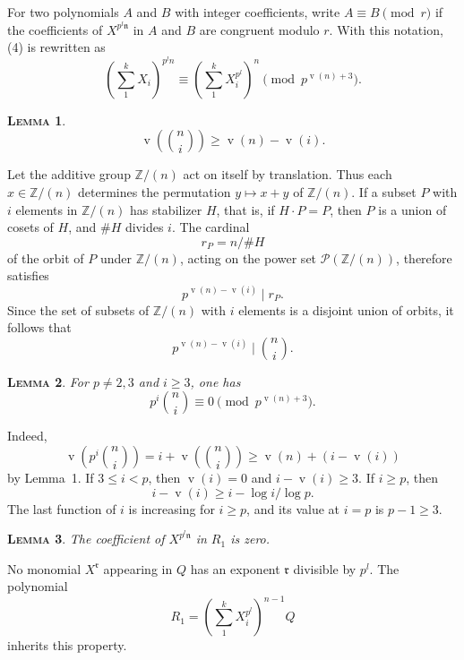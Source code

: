\documentclass[12pt]{amsart}
\theoremstyle{plain}
\newtheorem{lem}{\textsc{Lemma}}
\DeclareMathOperator{\vord}{v}
\begin{document}
For two polynomials $A$ and $B$ with integer coefficients, write $A\equiv B\pmod r$ if the coefficients of $X^{p^l\mathfrak n}$ in $A$ and $B$ are congruent modulo $r$. With this notation, (4) is rewritten as
\begin{equation}
\left(\sum_1^k X_i\right)^{p^l n}\equiv \left(\sum_1^k X_i^{p^l}\right)^n\pmod {p^{\vord(n)+3}}.\tag{8}
\end{equation}

\begin{lem}
\begin{equation}
\vord\!\left(\binom{n}{i}\right)\geq \vord(n)-\vord(i).\tag{9}
\end{equation}
\end{lem}

Let the additive group $\mathbb Z/(n)$ act on itself by translation. Thus each $x\in\mathbb Z/(n)$ determines the permutation $y\mapsto x+y$ of $\mathbb Z/(n)$. If a subset $P$ with $i$ elements in $\mathbb Z/(n)$ has stabilizer $H$, that is, if $H\cdot P=P$, then $P$ is a union of cosets of $H$, and $\#H$ divides $i$. The cardinal
\[
r_P=n/\#H
\]
of the orbit of $P$ under $\mathbb Z/(n)$, acting on the power set $\mathscr P(\mathbb Z/(n))$, therefore satisfies
\[
p^{\vord(n)-\vord(i)}\mid r_P.
\]
Since the set of subsets of $\mathbb Z/(n)$ with $i$ elements is a disjoint union of orbits, it follows that
\[
p^{\vord(n)-\vord(i)}\mid \binom{n}{i}.
\]

\begin{lem}
For $p\neq 2,3$ and $i\geq 3$, one has
\begin{equation}
p^i\binom{n}{i}\equiv 0\pmod {p^{\vord(n)+3}}.\tag{10}
\end{equation}
\end{lem}

Indeed,
\[
\vord\!\left(p^i\binom{n}{i}\right)=i+\vord\!\left(\binom{n}{i}\right)
\geq \vord(n)+(i-\vord(i))
\]
by Lemma~1. If $3\leq i<p$, then $\vord(i)=0$ and $i-\vord(i)\geq 3$. If $i\geq p$, then
\[
i-\vord(i)\geq i-\log i/\log p.
\]
The last function of $i$ is increasing for $i\geq p$, and its value at $i=p$ is $p-1\geq 3$.

\begin{lem}
The coefficient of $X^{p^l\mathfrak n}$ in $R_1$ is zero.
\end{lem}

No monomial $X^{\mathfrak r}$ appearing in $Q$ has an exponent $\mathfrak r$ divisible by $p^l$. The polynomial
\[
R_1=\left(\sum_1^k X_i^{p^l}\right)^{n-1}Q
\]
inherits this property.
\end{document}
